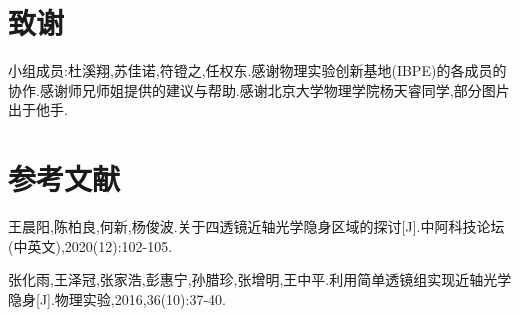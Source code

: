 \documentclass[UTF8]{gapd}
\begin{document}
\section*{致谢}
小组成员:杜溪翔,苏佳诺,符镫之,任权东.感谢物理实验创新基地(IBPE)的各成员的协作.感谢师兄师姐提供的建议与帮助.感谢北京大学物理学院杨天睿同学,部分图片出于他手.




\section*{参考文献}
\begin{thebibliography}{2}

王晨阳,陈柏良,何新,杨俊波.关于四透镜近轴光学隐身区域的探讨[J].中阿科技论坛(中英文),2020(12):102-105.

张化雨,王泽冠,张家浩,彭惠宁,孙腊珍,张增明,王中平.利用简单透镜组实现近轴光学隐身[J].物理实验,2016,36(10):37-40.

\end{thebibliography}

\end{document}
